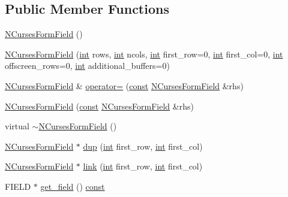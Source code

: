 \subsection*{Public Member Functions}
\begin{DoxyCompactItemize}
\item 
\hyperlink{class_n_curses_form_field_af8e6c1e955ef4d8f2da9f52b0af3f422}{N\-Curses\-Form\-Field} ()
\item 
\hyperlink{class_n_curses_form_field_a3bdb9eeefe6254b8e6ebfaa433b7a19b}{N\-Curses\-Form\-Field} (\hyperlink{term__entry_8h_ad65b480f8c8270356b45a9890f6499ae}{int} rows, \hyperlink{term__entry_8h_ad65b480f8c8270356b45a9890f6499ae}{int} ncols, \hyperlink{term__entry_8h_ad65b480f8c8270356b45a9890f6499ae}{int} first\-\_\-row=0, \hyperlink{term__entry_8h_ad65b480f8c8270356b45a9890f6499ae}{int} first\-\_\-col=0, \hyperlink{term__entry_8h_ad65b480f8c8270356b45a9890f6499ae}{int} offscreen\-\_\-rows=0, \hyperlink{term__entry_8h_ad65b480f8c8270356b45a9890f6499ae}{int} additional\-\_\-buffers=0)
\item 
\hyperlink{class_n_curses_form_field}{N\-Curses\-Form\-Field} \& \hyperlink{class_n_curses_form_field_aa3b8a2fcc2d7a68ca5ba084d6ae4f6d7}{operator=} (\hyperlink{term__entry_8h_a57bd63ce7f9a353488880e3de6692d5a}{const} \hyperlink{class_n_curses_form_field}{N\-Curses\-Form\-Field} \&rhs)
\item 
\hyperlink{class_n_curses_form_field_a5a936b5f160add0a70d4437e4d92e017}{N\-Curses\-Form\-Field} (\hyperlink{term__entry_8h_a57bd63ce7f9a353488880e3de6692d5a}{const} \hyperlink{class_n_curses_form_field}{N\-Curses\-Form\-Field} \&rhs)
\item 
virtual \hyperlink{class_n_curses_form_field_aa10ba05b7ccae394abbe04aa033e65c7}{$\sim$\-N\-Curses\-Form\-Field} ()
\item 
\hyperlink{class_n_curses_form_field}{N\-Curses\-Form\-Field} $\ast$ \hyperlink{class_n_curses_form_field_aa76ac0538a0a35d545df04aaea8dd60b}{dup} (\hyperlink{term__entry_8h_ad65b480f8c8270356b45a9890f6499ae}{int} first\-\_\-row, \hyperlink{term__entry_8h_ad65b480f8c8270356b45a9890f6499ae}{int} first\-\_\-col)
\item 
\hyperlink{class_n_curses_form_field}{N\-Curses\-Form\-Field} $\ast$ \hyperlink{class_n_curses_form_field_a0ca156299b2e10b1bf610fe4dae6aa5f}{link} (\hyperlink{term__entry_8h_ad65b480f8c8270356b45a9890f6499ae}{int} first\-\_\-row, \hyperlink{term__entry_8h_ad65b480f8c8270356b45a9890f6499ae}{int} first\-\_\-col)
\item 
F\-I\-E\-L\-D $\ast$ \hyperlink{class_n_curses_form_field_ae280cb9049352e4d77225d839edc9f46}{get\-\_\-field} () \hyperlink{term__entry_8h_a57bd63ce7f9a353488880e3de6692d5a}{const} 

\end{DoxyCompactItemize}
